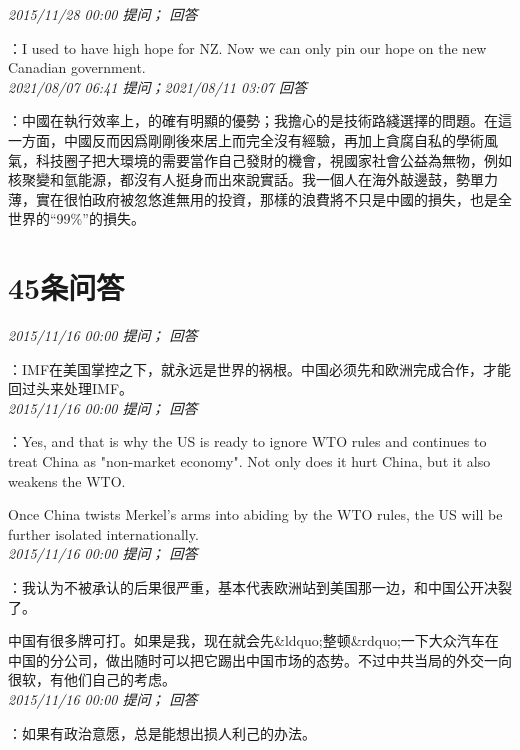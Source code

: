 \documentclass[twocolumn]{ctexart}
\begin{document}
\textit{\hfill\noindent\small 2015/11/28 00:00 提问； 回答}

：I used to have high hope for NZ. Now we can only pin our hope on the new Canadian government.\\

\textit{\hfill\noindent\small 2021/08/07 06:41 提问；2021/08/11 03:07 回答}

：中國在執行效率上，的確有明顯的優勢；我擔心的是技術路綫選擇的問題。在這一方面，中國反而因爲剛剛後來居上而完全沒有經驗，再加上貪腐自私的學術風氣，科技圈子把大環境的需要當作自己發財的機會，視國家社會公益為無物，例如核聚變和氫能源，都沒有人挺身而出來說實話。我一個人在海外敲邊鼓，勢單力薄，實在很怕政府被忽悠進無用的投資，那樣的浪費將不只是中國的損失，也是全世界的“99\%”的損失。
\\

\section{45条问答}

\textit{\hfill\noindent\small 2015/11/16 00:00 提问； 回答}

：IMF在美国掌控之下，就永远是世界的祸根。中国必须先和欧洲完成合作，才能回过头来处理IMF。\\

\textit{\hfill\noindent\small 2015/11/16 00:00 提问； 回答}

：Yes, and that is why the US is ready to ignore WTO rules and continues to treat China as "non-market economy". Not only does it hurt China, but it also weakens the WTO.

Once China twists Merkel's arms into abiding by the WTO rules, the US will be further isolated internationally.\\

\textit{\hfill\noindent\small 2015/11/16 00:00 提问； 回答}

：我认为不被承认的后果很严重，基本代表欧洲站到美国那一边，和中国公开决裂了。

中国有很多牌可打。如果是我，现在就会先\&ldquo;整顿\&rdquo;一下大众汽车在中国的分公司，做出随时可以把它踢出中国市场的态势。不过中共当局的外交一向很软，有他们自己的考虑。\\

\textit{\hfill\noindent\small 2015/11/16 00:00 提问； 回答}

：如果有政治意愿，总是能想出损人利己的办法。
\end{document}
